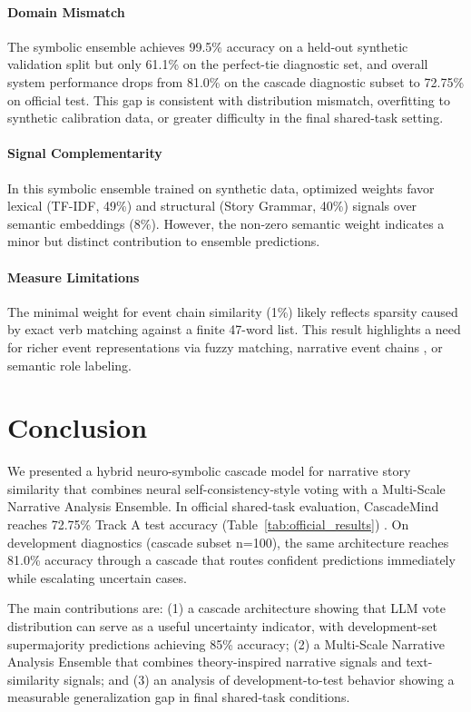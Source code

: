 \documentclass[11pt]{article}
\begin{document}
\paragraph{Domain Mismatch}
The symbolic ensemble achieves 99.5\% accuracy on a held-out synthetic validation split but only 61.1\% on the perfect-tie diagnostic set, and overall system performance drops from 81.0\% on the cascade diagnostic subset to 72.75\% on official test. This gap is consistent with distribution mismatch, overfitting to synthetic calibration data, or greater difficulty in the final shared-task setting.

\paragraph{Signal Complementarity}
In this symbolic ensemble trained on synthetic data, optimized weights favor lexical (TF-IDF, 49\%) and structural (Story Grammar, 40\%) signals over semantic embeddings (8\%). However, the non-zero semantic weight indicates a minor but distinct contribution to ensemble predictions.

\paragraph{Measure Limitations}
The minimal weight for event chain similarity (1\%) likely reflects sparsity caused by exact verb matching against a finite 47-word list. This result highlights a need for richer event representations via fuzzy matching, narrative event chains \citep{chambers2008narrativechains}, or semantic role labeling.

\section{Conclusion}

We presented a hybrid neuro-symbolic cascade model for narrative story similarity that combines neural self-consistency-style voting with a Multi-Scale Narrative Analysis Ensemble. In official shared-task evaluation, CascadeMind reaches 72.75\% Track A test accuracy (Table~\ref{tab:official_results}) \citep{hatzel-etal-2026-semeval,narrative-similarity-results-2026}. On development diagnostics (cascade subset n=100), the same architecture reaches 81.0\% accuracy through a cascade that routes confident predictions immediately while escalating uncertain cases.

The main contributions are: (1) a cascade architecture showing that LLM vote distribution can serve as a useful uncertainty indicator, with development-set supermajority predictions achieving 85\% accuracy; (2) a Multi-Scale Narrative Analysis Ensemble that combines theory-inspired narrative signals and text-similarity signals; and (3) an analysis of development-to-test behavior showing a measurable generalization gap in final shared-task conditions.
\end{document}
